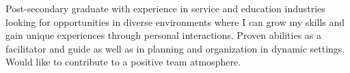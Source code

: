\begin{cvparagraph}
Post-secondary graduate with experience in service and education industries looking for opportunities in diverse environments where I can grow my skills and gain unique experiences through personal interactions. Proven abilities as a facilitator and guide as well as in planning and organization in dynamic settings. Would like to contribute to a positive team atmosphere.
\end{cvparagraph}
